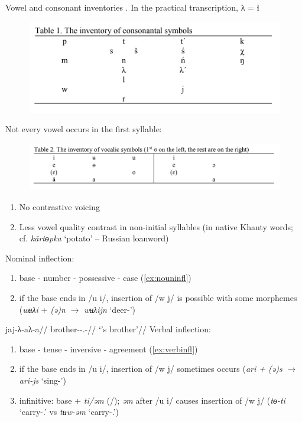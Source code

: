 \documentclass[a4paper, 12pt]{article}
\begin{document}
	\noindent Vowel and consonant inventories \parencite{lketal2018}. In the practical transcription, λ = ɬ
	
	\begin{figure}[H]
		\includegraphics[scale=.66]{consonants}
	\end{figure}
	
	\newpage
	\noindent Not every vowel occurs in the first syllable:
	
	\begin{figure}[H]
		\includegraphics[scale=.66]{vowels}
	\end{figure}
	
\begin{enumerate}[$\gg$]
	\item No contrastive voicing
	\item Less vowel quality contrast in non-initial syllables (in native Khanty words; cf. \emph{kǎrtɵpka} `potato' -- Russian loanword)
\end{enumerate}
	Nominal inflection:

\begin{enumerate}[$\gg$]
	\item base - number - possessive - case (\ref{ex:nouninfl})
	\item if the base ends in /u i/, insertion of /w j/ is possible with some morphemes (\emph{wʉλi} + \emph{(ə)n} $\rightarrow$ \emph{wʉλijn} `deer-{\Loc}')
\end{enumerate}

\ex
\begingl\label{ex:nouninfl}
	\gla jaj-λ-aλ-a//
	\glb brother-{\Pl}-{\Poss}.{\Tsg}-{\Dat}//
	\glft `{\Tsg}'s brother'//
\endgl
\xe
	Verbal inflection:

\begin{enumerate}[$\gg$]
	\item base - tense - inversive - agreement (\ref{ex:verbinfl})
	\item if the base ends in /u i/, insertion of /w j/ sometimes occurs (\emph{ari + (ə)s} $\rightarrow$ \emph{ari-js} `sing-{\Pst}')
	\item infinitive: base + \emph{ti/əm} ({\Npst}/{\Pst}); \emph{əm} after /u i/ causes insertion of /w j/ (\emph{tɵ-ti} `carry-{\Nfin}.{\Npst}' vs \emph{tʉw-əm} `carry-{\Nfin}.{\Pst}')
\end{enumerate}
\end{document}
